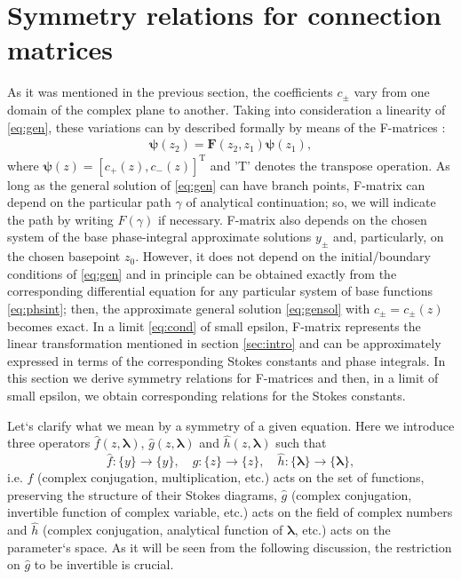 \documentclass[atmp]{ipart_v1}
\def\lmbd{\bm{\lambda}}
\def\psii{\bm\psi}
\def\F{\bm{F}}
\def\f{\hat{f}}
\def\g{\hat{g}}
\def\h{\hat{h}}
\def\T{\mathrm{T}}
\newcommand\eref[1]{\eqref{#1}}
\newcommand\sref[1]{section \ref{#1}}
\begin{document}
\section{Symmetry relations for connection matrices \label{sec:fmtrsymm}}
As it was mentioned in the previous section, the coefficients $c_\pm$ 
vary from one domain of the complex plane to another. Taking into consideration
a linearity of \eref{eq:gen}, these variations can by described formally by means 
of the F-matrices \cite{frbook}:
\begin{eqnarray}
\psii(z_2) = \F(z_2,z_1) \psii(z_1),
\end{eqnarray}
where $\psii(z) = [{c_+(z),c_-(z)}]^{\T}$ and 'T' denotes the transpose operation. As long as the
general solution of \eref{eq:gen} can have branch points, F-matrix can depend on the particular path 
$\gamma$ of analytical continuation; so, we will indicate the path by writing $F(\gamma)$ if necessary. 
F-matrix also depends on the chosen system of the base phase-integral 
approximate solutions $y_\pm$ and, particularly, on the chosen basepoint $z_0$. 
However, it does not depend on the initial/boundary conditions 
of \eref{eq:gen} and in principle can be obtained exactly from the corresponding differential 
equation \cite{frbook} for any particular system of base functions \eref{eq:phsint}; 
then, the approximate general solution \eref{eq:gensol} with $c_\pm=c_\pm(z)$ becomes exact. 
In a limit \eref{eq:cond} of small epsilon, F-matrix represents the linear transformation
mentioned in \sref{sec:intro} and can be approximately expressed in terms of the corresponding
Stokes constants and phase integrals. In this section we derive symmetry relations for F-matrices
and then, in a limit of small epsilon, we obtain corresponding relations for the Stokes constants.
 
Let`s clarify what we mean by a symmetry of a given equation. Here we introduce three operators
$\f(z,\lmbd)$, $\g(z,\lmbd)$ and $\h(z,\lmbd)$ such that
\begin{equation}
\f:\{y\} \rightarrow \{y\}, \quad
\g:\{z\} \rightarrow \{z\}, \quad
\h:\{\lmbd\} \rightarrow \{\lmbd\},
\end{equation}
i.e. $\f$ (complex conjugation, multiplication, etc.) acts on the set of functions, preserving 
the structure of their Stokes diagrams, $\g$ (complex conjugation, invertible function of 
complex variable, etc.) acts on the field of complex numbers and $\h$ (complex conjugation, 
analytical function of $\lmbd$, etc.) acts on the parameter`s space. As it will be seen from the
following discussion, the restriction on $\g$ to be invertible is crucial. 
\end{document}
